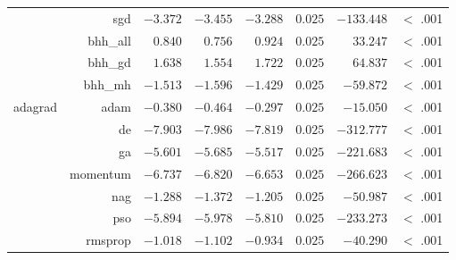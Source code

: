 \begin{table}[htb]
{\begin{tabular}{lrrrrrrr}
			                     & sgd                  & $-3.372$             & $-3.455$                                        & $-3.288$             & $0.025$              & $-133.448$           & $<$ .001    \\
			                     & bhh\_all             & $0.840$              & $0.756$                                         & $0.924$              & $0.025$              & $33.247$             & $<$ .001    \\
			                     & bhh\_gd              & $1.638$              & $1.554$                                         & $1.722$              & $0.025$              & $64.837$             & $<$ .001    \\
			                     & bhh\_mh              & $-1.513$             & $-1.596$                                        & $-1.429$             & $0.025$              & $-59.872$            & $<$ .001    \\
			adagrad              & adam                 & $-0.380$             & $-0.464$                                        & $-0.297$             & $0.025$              & $-15.050$            & $<$ .001    \\
			$ $                  & de                   & $-7.903$             & $-7.986$                                        & $-7.819$             & $0.025$              & $-312.777$           & $<$ .001    \\
			                     & ga                   & $-5.601$             & $-5.685$                                        & $-5.517$             & $0.025$              & $-221.683$           & $<$ .001    \\
			                     & momentum             & $-6.737$             & $-6.820$                                        & $-6.653$             & $0.025$              & $-266.623$           & $<$ .001    \\
			                     & nag                  & $-1.288$             & $-1.372$                                        & $-1.205$             & $0.025$              & $-50.987$            & $<$ .001    \\
			                     & pso                  & $-5.894$             & $-5.978$                                        & $-5.810$             & $0.025$              & $-233.273$           & $<$ .001    \\
			                     & rmsprop              & $-1.018$             & $-1.102$                                        & $-0.934$             & $0.025$              & $-40.290$            & $<$ .001    \\

\end{tabular}}
\end{table}
